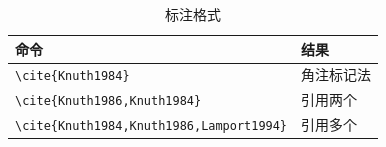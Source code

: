 \begin{table}[H]
    \centering
    \caption{标注格式}
    \label{tab-ref}
    \begin{tabular}{ll}
        \toprule
        命令                                            & 结果                                         \\
        \midrule
        \verb|\cite{Knuth1984}|                       & 角注标记法\cite{Knuth1984}                      \\
        \verb|\cite{Knuth1986,Knuth1984}|             & 引用两个\cite{Knuth1986,Knuth1984}             \\
        \verb|\cite{Knuth1984,Knuth1986,Lamport1994}| & 引用多个\cite{Knuth1984,Knuth1986,Lamport1994} \\
        \bottomrule
    \end{tabular}
\end{table}
